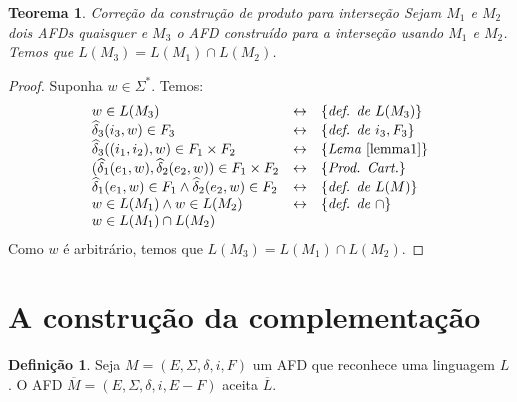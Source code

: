 \documentclass[a4paper]{article}
\newtheorem{Theorem}{Teorema}
\theoremstyle{definition}
\newtheorem{Definition}{Definição}
\begin{document}
  \begin{Theorem}{Correção da construção de produto para interseção}
    Sejam $M_1$ e $M_2$ dois AFDs quaisquer e $M_3$ o AFD construído para
    a interseção usando $M_1$ e $M_2$. Temos que $L(M_3) = L(M_1) \cap L(M_2)$.
  \end{Theorem}
  \begin{proof}
    Suponha $w \in \Sigma^*$. Temos:
    \[
      \begin{array}{lcl}
        w \in L(M_3) & \leftrightarrow & \{\textit{def. de }L(M_3)\}\\
        \widehat{\delta}_3(i_3,w) \in F_3 & \leftrightarrow & \{\textit{def. de }i_3,F_3\}\\
        \widehat{\delta}_3((i_1,i_2),w) \in F_1 \times F_2 & \leftrightarrow &
                                                                               \{\textit{Lema
                                                                               }
                                                                               \ref{lemma1}\}
        \\
        (\widehat{\delta}_1(e_1,w),\widehat{\delta}_2(e_2,w)) \in F_1\times F_2
                     & \leftrightarrow & \{\textit{Prod. Cart.}\} \\
        \widehat{\delta}_1(e_1,w) \in F_1 \land \widehat{\delta}_2(e_2,w)\in F_2
                     & \leftrightarrow & \{\textit{def. de }L(M)\} \\
        w \in L(M_1) \land w \in L(M_2) & \leftrightarrow & \{\textit{def.
                                                            de }\cap\}\\
        w \in L(M_1) \cap L(M_2)
      \end{array}
    \]
    Como $w$ é arbitrário, temos que $L(M_3) = L(M_1)\cap L(M_2)$.
  \end{proof}

  \section{A construção da complementação}

  \begin{Definition}
    Seja $M=(E,\Sigma,\delta,i,F)$ um AFD que reconhece uma linguagem $L$.
    O AFD $\overline{M} = (E,\Sigma,\delta,i,E - F)$ aceita $\overline{L}$.
  \end{Definition}
\end{document}
